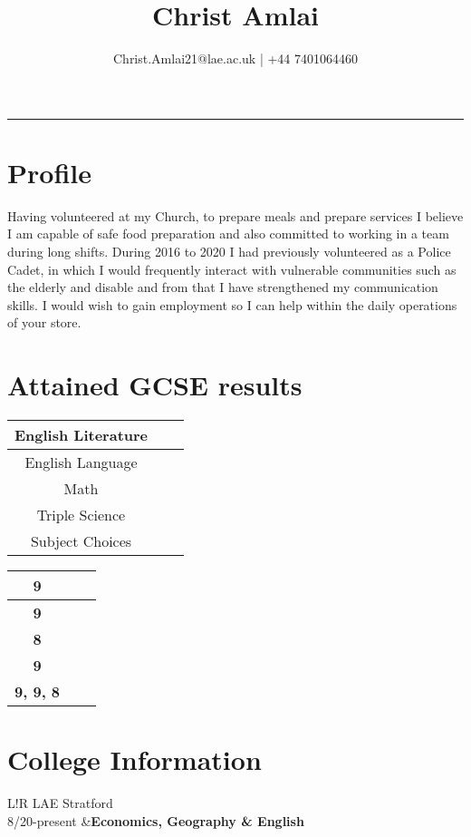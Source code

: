 \documentclass[10pt]{article}
\title{\bfseries\Huge Christ Amlai}
\author{Christ.Amlai21@lae.ac.uk | +44 7401064460}
\date{}
\newcommand\VRule{\color{lightgray}\vrule width 0.5pt}
\begin{document}
\maketitle
\par\rule{\textwidth}{1pt}
\section*{Profile}

Having volunteered at my Church, to prepare meals and prepare services I believe I am capable of safe food preparation and also committed to working in a team during long shifts. During 2016 to 2020 I had previously volunteered as a Police Cadet, in which I would frequently interact with vulnerable communities such as the elderly and disable and from that I have strengthened my communication skills. I would wish to gain employment so I can help within the daily operations of your store.

\section*{Attained GCSE results}

\begin{tabular}{ccc}
    \hline
English Literature\\
\hline
English Language\\
\hline
Math\\
\hline
Triple Science\\
\hline
Subject Choices\\
\hline
\end{tabular}
\quad
\begin{tabular}{ccc}
\hline
    \textbf{9}\\
\hline
    \textbf{9}\\
\hline
    \textbf{8}\\
\hline
    \textbf{9}\\
\hline
    \textbf{9, 9, 8}\\
\hline
\end{tabular}
\section*{College Information}
\begin{tabular}{L!{\VRule}R}
\small{LAE Stratford}\\
\footnotesize{8/20-present}
    &\textbf{Economics, Geography \& English}
\end{tabular}
\end{document}
